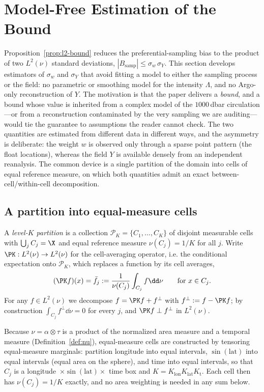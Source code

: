 \section{Model-Free Estimation of the Bound}
\label{sec:estimation}

Proposition~\ref{prop:l2-bound} reduces the preferential-sampling bias
to the product of two $L^2(\nu)$ standard deviations,
$|B_{\mathrm{samp}}|\le\sigma_w\,\sigma_Y$. This section develops
estimators of $\sigma_w$ and $\sigma_Y$ that avoid fitting a model to
either the sampling process or the field: no parametric or smoothing
model for the intensity $\Lambda$, and no Argo-only reconstruction of
$Y$. The motivation is that the paper delivers a \emph{bound}, and a
bound whose value is inherited from a complex model of the
$1000$\,dbar circulation---or from a reconstruction contaminated by the
very sampling we are auditing---would tie the guarantee to assumptions
the reader cannot check. The two quantities are estimated from
different data in different ways, and the asymmetry is deliberate: the
weight $w$ is observed only through a sparse point pattern (the float
locations), whereas the field $Y$ is available densely from an
independent reanalysis. The common device is a single partition of the
domain into cells of equal reference measure, on which both quantities
admit an exact between-cell/within-cell decomposition.

\subsection{A partition into equal-measure cells}
\label{sec:partition}

\begin{definition}
\label{def:partition}
A \emph{level-$K$ partition} is a collection
$\mathcal{P}_K=\{C_1,\dots,C_K\}$ of disjoint measurable cells with
$\bigcup_j C_j=\X$ and equal reference measure
$\nu(C_j)=1/K$ for all $j$. Write $\PK:L^2(\nu)\to L^2(\nu)$ for the
cell-averaging operator, i.e. the conditional expectation onto
$\mathcal{P}_K$, which replaces a function by its cell averages,
\[
  (\PK f)(x)=\bar f_j:=\frac{1}{\nu(C_j)}\int_{C_j} f\dd\nu
  \qquad\text{for }x\in C_j .
\]
For any $f\in L^2(\nu)$ we decompose $f=\PK f+f^{\perp}$ with
$f^{\perp}:=f-\PK f$; by construction $\int_{C_j}f^{\perp}\dd\nu=0$ for
every $j$, and $\PK f\perp f^{\perp}$ in $L^2(\nu)$.
\end{definition}

Because $\nu=\alpha\otimes\tau$ is a product of the normalized area
measure and a temporal measure (Definition~\ref{def:nu}), equal-measure
cells are constructed by tensoring equal-measure marginals: partition
longitude into equal intervals, $\sin(\mathrm{lat})$ into equal
intervals (equal area on the sphere), and time into equal intervals,
so that $C_j$ is a longitude~$\times\sin(\mathrm{lat})\times$ time box
and $K=K_{\mathrm{lon}}K_{\mathrm{lat}}K_{\mathrm{t}}$. Each cell then
has $\nu(C_j)=1/K$ exactly, and no area weighting is needed in any sum
below.

